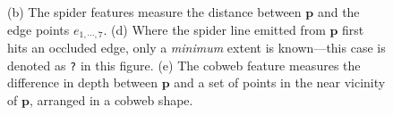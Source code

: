 \documentclass[10pt,twocolumn,letterpaper]{article}
\newcommand{\point}{\mathbf{p}}
\begin{document}
\begin{figure}
{        \label{fig:features:occluded_spider}}
        \hfill
        \hfill
    \caption{
    (b) The spider features measure the distance between $\point$ and the edge points $e_{1, \cdots, 7}$.
    (d) Where the spider line emitted from $\point$ first hits an occluded edge, only a \textit{minimum} extent is known---this case is denoted as \texttt{?} in this figure.
    (e) The cobweb feature measures the difference in depth between $\point$ and a set of points in the near vicinity of $\point$, arranged in a cobweb shape.}%
    \label{fig:features}
\end{figure}
\end{document}
